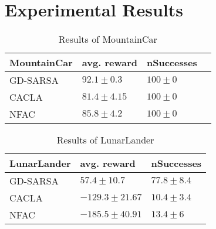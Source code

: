\section{Experimental Results}

\begin{table}[]
\centering
\label{MC_results}
\begin{tabular}{|l|l|l|l|}
\cline{1-3}
MountainCar & avg. reward & nSuccesses  \\ \hline
GD-SARSA    &  $92.1 \pm 0.3$                    &        $100 \pm 0$                        \\ \hline
CACLA       &       $81.4 \pm 4.15$                           &          $100 \pm 0$                   \\ \hline
NFAC        &           $85.8 \pm 4.2$                       &          $100 \pm 0$                    \\ \hline
\end{tabular}
\caption{Results of MountainCar}
\end{table}

\begin{table}[]
\centering
\label{LL_results}
\begin{tabular}{|l|l|l|}
\cline{1-3}
LunarLander & avg. reward & nSuccesses  \\ \hline
GD-SARSA    &  $57.4 \pm 10.7$                    &        $77.8 \pm 8.4$                          \\ \hline
CACLA       &       $-129.3 \pm 21.67$                           &          $10.4 \pm 3.4$                         \\ \hline
NFAC        &           $-185.5 \pm 40.91$                       &          $13.4 \pm 6$                    \\ \hline
\end{tabular}
\caption{Results of LunarLander}
\end{table}
